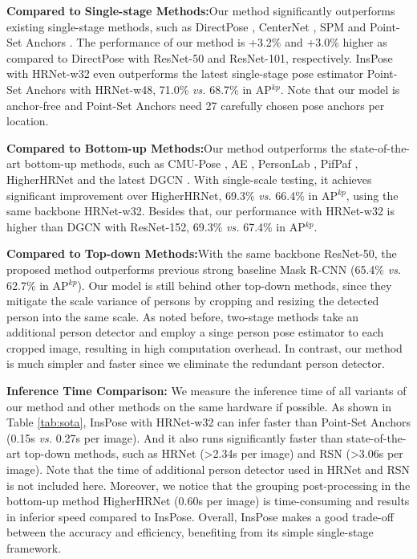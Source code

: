 \documentclass[sigconf]{acmart}
\begin{document}
\textbf{Compared to Single-stage Methods:}\quad Our method significantly outperforms existing single-stage methods, such as DirectPose \cite{tian2019directpose}, CenterNet \cite{zhou2019objects}, SPM \cite{nie2019single} and Point-Set Anchors \cite{wei2020point}. The performance of our method is +3.2\% and +3.0\% higher as compared to DirectPose \cite{tian2019directpose} with ResNet-50 and ResNet-101, respectively. InsPose with HRNet-w32 even outperforms the latest single-stage pose estimator Point-Set Anchors \cite{wei2020point} with HRNet-w48, 71.0\% \textit{vs.} 68.7\% in AP$^{kp}$. Note that our model is anchor-free and Point-Set Anchors need 27 carefully chosen pose anchors per location.

\textbf{Compared to Bottom-up Methods:}\quad Our method outperforms the state-of-the-art bottom-up methods, such as CMU-Pose \cite{cao2017realtime}, AE \cite{newell2016associative}, PersonLab \cite{papandreou2018personlab}, PifPaf \cite{kreiss2019pifpaf}, HigherHRNet \cite{cheng2020higherhrnet} and the latest DGCN \cite{qiu2020dgcn}. With single-scale testing, it achieves significant improvement over HigherHRNet, 69.3\% \textit{vs.} 66.4\% in AP$^{kp}$, using the same backbone HRNet-w32. Besides that, our performance with HRNet-w32 is higher than DGCN \cite{qiu2020dgcn} with ResNet-152, 69.3\% \textit{vs.} 67.4\% in AP$^{kp}$.

\textbf{Compared to Top-down Methods:}\quad With the same backbone ResNet-50, the proposed method outperforms previous strong baseline Mask R-CNN (65.4\% \textit{vs.} 62.7\% in AP$^{kp}$). Our model is still behind other top-down methods, since they mitigate the scale variance of persons by cropping and resizing the detected person into the same scale. As noted before, two-stage methods take an additional person detector and employ a singe person pose estimator to each cropped image, resulting in high computation overhead. In contrast, our method is much simpler and faster since we eliminate the redundant person detector.

\textbf{Inference Time Comparison:}\quad
We measure the inference time of all variants of our method and other methods on the same hardware if possible.
As shown in Table \ref{tab:sota},
InsPose with HRNet-w32 can infer faster than Point-Set Anchors \cite{wei2020point} (0.15s \textit{vs.} 0.27s per image).
And it also runs significantly faster than state-of-the-art top-down methods, such as HRNet \cite{sun2019deep} (>2.34s per image) and RSN \cite{cai2020learning} (>3.06s per image).
Note that the time of additional person detector used in HRNet and RSN is not included here.
Moreover, we notice that the grouping post-processing in the bottom-up method HigherHRNet \cite{cheng2020higherhrnet} (0.60s per image) is time-consuming and results in inferior speed compared to InsPose.
Overall, InsPose makes a good trade-off between the accuracy and efficiency, benefiting from its simple single-stage framework.
\end{document}
